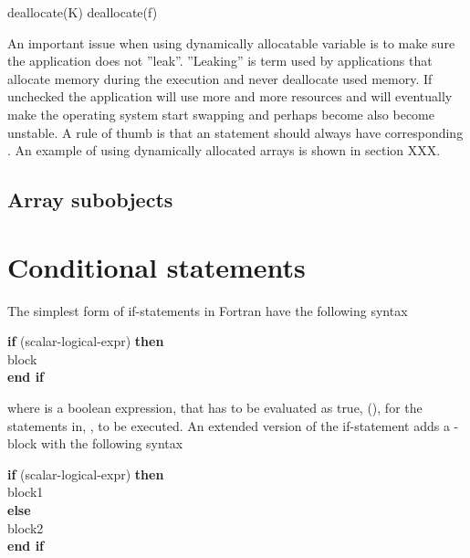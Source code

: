 \begin{fortrancodeenv}
deallocate(K)
deallocate(f)
\end{fortrancodeenv}

An important issue when using dynamically allocatable variable is to make sure the application does not ''leak''. ''Leaking'' is term used by applications that allocate memory during the execution and never deallocate used memory. If unchecked the application will use more and more resources and will eventually make the operating system start swapping and perhaps become also become unstable. A rule of thumb is that an
 statement should always have corresponding . An example of using dynamically allocated arrays is shown in section XXX.

\subsection{Array subobjects}

\section{Conditional statements}

The simplest form of if-statements in Fortran have the following syntax

\begin{fsyntax}
\textbf{if} (scalar-logical-expr) \textbf{then}\\
\ftab  block\\
\textbf{end if}\\
\end{fsyntax}

where  is a boolean expression, that has to be evaluated as true, (), for the statements in, , to be executed. An extended version of the if-statement adds a -block with the following syntax

\begin{fsyntax}
\textbf{if} (scalar-logical-expr) \textbf{then}\\
\ftab block1\\
\textbf{else}\\
\ftab block2\\
\textbf{end if}\\
\end{fsyntax}

